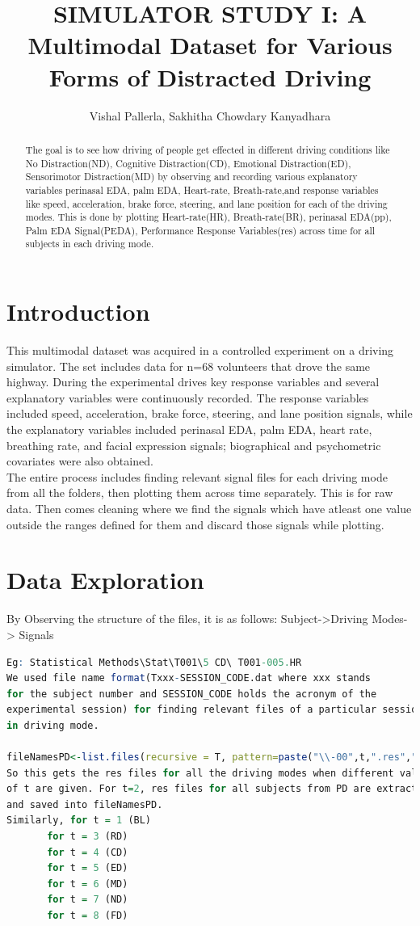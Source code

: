 \documentclass[a4paper]{article}
\title{SIMULATOR STUDY I: A Multimodal Dataset for Various Forms of Distracted Driving}
\author{Vishal Pallerla, Sakhitha Chowdary Kanyadhara}
\begin{document}
\maketitle
 \begin{abstract}
 The goal is to see how driving of people get effected in different driving conditions like No Distraction(ND), Cognitive Distraction(CD), Emotional Distraction(ED), Sensorimotor Distraction(MD) by observing and recording various explanatory variables perinasal EDA, palm EDA, Heart-rate, Breath-rate,and response variables like speed, acceleration, brake force, steering, and lane position for each of the driving modes. This is done by plotting Heart-rate(HR), Breath-rate(BR), perinasal EDA(pp), Palm EDA Signal(PEDA), Performance Response Variables(res) across time for all subjects in each driving mode.
 \end{abstract}

\section{Introduction}
This multimodal dataset was acquired in a controlled experiment on a driving simulator. The set includes data for n=68 volunteers that drove the same highway. During the experimental drives key response variables and several explanatory variables were continuously recorded. The response variables included speed, acceleration, brake force, steering, and lane position signals, while the explanatory variables included perinasal EDA, palm EDA, heart rate, breathing rate, and facial expression signals; biographical and psychometric covariates were also obtained.\\
The entire process includes finding relevant signal files for each driving mode from all the folders, then plotting them across time separately. This is for raw data. Then comes cleaning where we find the signals which have atleast one value outside the ranges defined for them and discard those signals while plotting.


\section{Data Exploration}
By Observing the structure of the files, it is as follows:
Subject->Driving Modes-> Signals
\begin{lstlisting}[language=R]
Eg: Statistical Methods\Stat\T001\5 CD\ T001-005.HR
We used file name format(Txxx-SESSION_CODE.dat where xxx stands
for the subject number and SESSION_CODE holds the acronym of the
experimental session) for finding relevant files of a particular session
in driving mode.

fileNamesPD<-list.files(recursive = T, pattern=paste("\\-00",t,".res","$",sep = ""))
So this gets the res files for all the driving modes when different values
of t are given. For t=2, res files for all subjects from PD are extracted
and saved into fileNamesPD.
Similarly, for t = 1 (BL)
	   for t = 3 (RD)
	   for t = 4 (CD)
	   for t = 5 (ED)
	   for t = 6 (MD)
	   for t = 7 (ND)
	   for t = 8 (FD)
\end{lstlisting}
\end{document}
